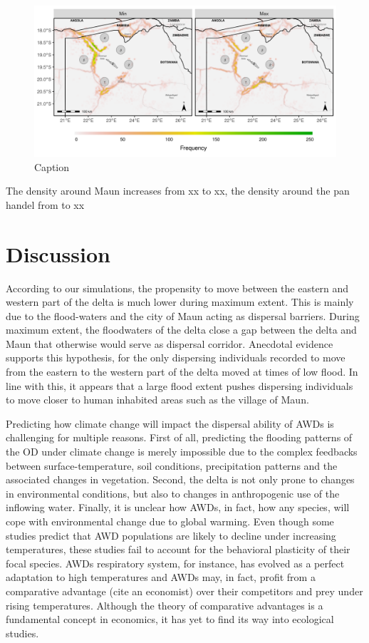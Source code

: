 \documentclass[abstract=on,10pt,a4paper,bibliography=totocnumbered]{article}
\begin{document}
\begin{figure}
  \begin{center}
  \includegraphics[width = \textwidth]{99_Distance.png}
  \caption{Caption}
  \label{Distance}
  \end{center}
\end{figure}

The density around Maun increases from xx to xx, the density around the pan
handel from to xx

% 
% 
% 

\section{Discussion}
According to our simulations, the propensity to move between the eastern and
western part of the delta is much lower during maximum extent. This is mainly
due to the flood-waters and the city of Maun acting as dispersal barriers.
During maximum extent, the floodwaters of the delta close a gap between the
delta and Maun that otherwise would serve as dispersal corridor. Anecdotal
evidence supports this hypothesis, for the only dispersing individuals recorded
to move from the eastern to the western part of the delta moved at times of low
flood. In line with this, it appears that a large flood extent pushes dispersing
individuals to move closer to human inhabited areas such as the village of Maun.

Predicting how climate change will impact the dispersal ability of AWDs is
challenging for multiple reasons. First of all, predicting the flooding patterns
of the OD under climate change is merely impossible due to the complex feedbacks
between surface-temperature, soil conditions, precipitation patterns and the
associated changes in vegetation. Second, the delta is not only prone to changes
in environmental conditions, but also to changes in anthropogenic use of the
inflowing water. Finally, it is unclear how AWDs, in fact, how any
species, will cope with environmental change due to global warming. Even though
some studies predict that AWD populations are likely to decline under increasing
temperatures, these studies fail to account for the behavioral plasticity of
their focal species. AWDs respiratory system, for instance, has evolved as a
perfect adaptation to high temperatures and AWDs may, in fact, profit from a
comparative advantage (cite an economist) over their competitors and prey under
rising temperatures. Although the theory of comparative advantages is a
fundamental concept in economics, it has yet to find its way into ecological
studies.
\end{document}
